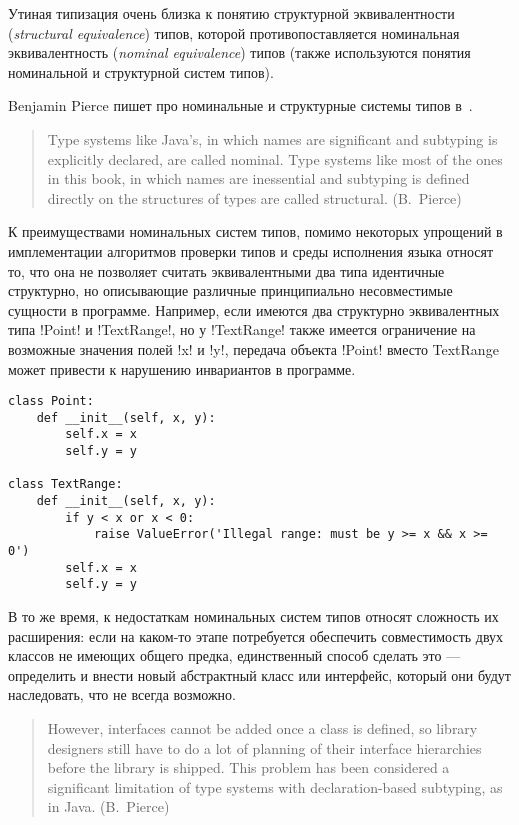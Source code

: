Утиная типизация очень близка к понятию структурной эквивалентности
(\emph{structural equivalence}) типов, которой противопоставляется номинальная
эквивалентность (\emph{nominal equivalence}) типов (также используются понятия
номинальной и структурной систем типов).

Benjamin Pierce пишет про номинальные и структурные системы типов в~\cite{Pierce2002}.

\begin{quote}
Type systems like Java’s, in which names are significant and subtyping is
explicitly declared, are called nominal. Type systems like most of the ones in
this book, in which names are inessential and subtyping is defined directly on
the structures of types are called structural.
(B.~Pierce)
\end{quote}

К преимуществами номинальных систем типов, помимо некоторых упрощений в
имплементации алгоритмов проверки типов и среды исполнения языка относят то,
что она не позволяет считать эквивалентными два типа идентичные структурно, но
описывающие различные принципиально несовместимые сущности в программе.
Например, если имеются два структурно эквивалентных типа !Point! и
!TextRange!, но у !TextRange! также имеется ограничение на
возможные значения полей !x! и !y!, передача объекта !Point! вместо
TextRange может привести к нарушению инвариантов в программе.

\begin{lstlisting}
class Point:
    def __init__(self, x, y):
        self.x = x
        self.y = y

class TextRange:
    def __init__(self, x, y):
        if y < x or x < 0:
            raise ValueError('Illegal range: must be y >= x && x >= 0')
        self.x = x
        self.y = y
\end{lstlisting}

В то же время, к недостаткам номинальных систем типов относят сложность их
расширения: если на каком-то этапе потребуется обеспечить совместимость двух
классов не имеющих общего предка, единственный способ сделать это --- определить
и внести новый абстрактный класс или интерфейс, который они будут наследовать,
что не всегда возможно.  

\begin{quote}
However, interfaces cannot be added once a class is defined, so library
designers still have to do a lot of planning of their interface hierarchies
before the library is shipped. This problem has been considered a significant
limitation of type systems with declaration-based subtyping, as in Java.
(B.~Pierce)
\end{quote}

